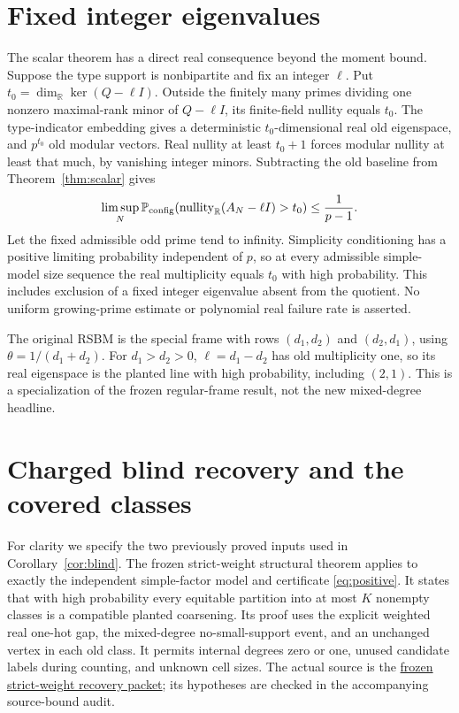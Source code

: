 \documentclass[11pt]{article}
\newcommand{\Prob}{\mathbb P}
\newcommand{\nullity}{\operatorname{nullity}}
\begin{document}
\section{Fixed integer eigenvalues}
The scalar theorem has a direct real consequence beyond the moment bound. Suppose the type support is nonbipartite and fix an integer $\ell$. Put $t_0=\dim_{\mathbb R}\ker(Q-\ell I)$. Outside the finitely many primes dividing one nonzero maximal-rank minor of $Q-\ell I$, its finite-field nullity equals $t_0$. The type-indicator embedding gives a deterministic $t_0$-dimensional real old eigenspace, and $p^{t_0}$ old modular vectors. Real nullity at least $t_0+1$ forces modular nullity at least that much, by vanishing integer minors. Subtracting the old baseline from Theorem~\ref{thm:scalar} gives
\[
 \limsup_N\Prob_{\rm config}
       (\nullity_{\mathbb R}(A_N-\ell I)>t_0)\le\frac1{p-1}.
\]
Let the fixed admissible odd prime tend to infinity. Simplicity conditioning has a positive limiting probability independent of $p$, so at every admissible simple-model size sequence the real multiplicity equals $t_0$ with high probability. This includes exclusion of a fixed integer eigenvalue absent from the quotient. No uniform growing-prime estimate or polynomial real failure rate is asserted.

The original RSBM is the special frame with rows $(d_1,d_2)$ and $(d_2,d_1)$, using $\theta=1/(d_1+d_2)$. For $d_1>d_2>0$, $\ell=d_1-d_2$ has old multiplicity one, so its real eigenspace is the planted line with high probability, including $(2,1)$. This is a specialization of the frozen regular-frame result, not the new mixed-degree headline.

\section{Charged blind recovery and the covered classes}
For clarity we specify the two previously proved inputs used in Corollary~\ref{cor:blind}. The frozen strict-weight structural theorem applies to exactly the independent simple-factor model and certificate \eqref{eq:positive}. It states that with high probability every equitable partition into at most $K$ nonempty classes is a compatible planted coarsening. Its proof uses the explicit weighted real one-hot gap, the mixed-degree no-small-support event, and an unchanged vertex in each old class. It permits internal degrees zero or one, unused candidate labels during counting, and unknown cell sizes. The actual source is the \href{../../../partitioning-frontier-session/nonregular-fibers/strict-q-recovery/strict-q-blind-frame-recovery.pdf}{frozen strict-weight recovery packet}; its hypotheses are checked in the accompanying source-bound audit.
\end{document}
